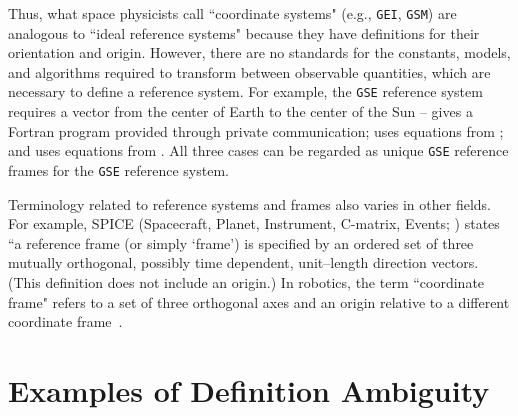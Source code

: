 \documentclass[draft]{agujournal2019}
\begin{document}
Thus, what space physicists call ``coordinate systems" (e.g., \texttt{GEI}, \texttt{GSM}) are analogous to ``ideal reference systems" because they have definitions for their orientation and origin. However, there are no standards for the constants, models, and algorithms required to transform between observable quantities, which are necessary to define a reference system. For example, the \texttt{GSE} reference system requires a vector from the center of Earth to the center of the Sun --  gives a Fortran program provided through private communication;  uses equations from ; and 
 uses equations from . All three cases can be regarded as unique \texttt{GSE} reference frames for the \texttt{GSE} reference system.


Terminology related to reference systems and frames also varies in other fields. For example, SPICE (Spacecraft, Planet, Instrument, C-matrix, Events; ) states ``a reference frame (or simply `frame') is specified by an ordered set of three mutually orthogonal, possibly time dependent, unit--length direction vectors. (This definition does not include an origin.) In robotics, the term ``coordinate frame" refers to a set of three orthogonal axes and an origin relative to a different coordinate frame~\cite{Murray2017}. 

\section{Examples of Definition Ambiguity}
\label{sect:definitions}
\end{document}
